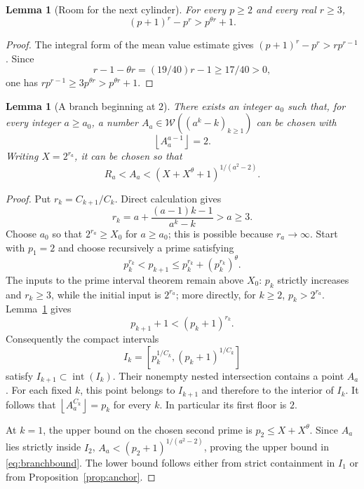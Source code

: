 \documentclass[11pt,a4paper]{article}
\newtheorem{lemma}[theorem]{Lemma}
\theoremstyle{definition}\newtheorem{definition}[theorem]{Definition}
\theoremstyle{remark}\newtheorem{remark}[theorem]{Remark}
\newcommand{\floor}[1]{\left\lfloor #1\right\rfloor}\newcommand{\ceil}[1]{\left\lceil #1\right\rceil}
\newcommand{\WW}{\mathcal W}
\begin{document}
\begin{lemma}[Room for the next cylinder]\label{lem:room}
For every $p\ge2$ and every real $r\ge3$,
\[
 (p+1)^r-p^r>p^{\theta r}+1.
\]
\end{lemma}
\begin{proof}
The integral form of the mean value estimate gives
$(p+1)^r-p^r>rp^{r-1}$. Since
\[
 r-1-\theta r=(19/40)r-1\ge17/40>0,
\]
one has $rp^{r-1}\ge3p^{\theta r}>p^{\theta r}+1$.
\end{proof}

\begin{lemma}[A branch beginning at $2$]\label{lem:branch}
There exists an integer $a_0$ such that, for every integer $a\ge a_0$,
a number $A_a\in\WW((a^k-k)_{k\ge1})$ can be chosen with
\[
 \floor{A_a^{a-1}}=2.
\]
Writing $X=2^{r_a}$, it can be chosen so that
\begin{equation}\label{eq:branchbound}
 R_a<A_a<(X+X^\theta+1)^{1/(a^2-2)}.
\end{equation}
\end{lemma}
\begin{proof}
Put $r_k=C_{k+1}/C_k$. Direct calculation gives
\begin{equation}\label{eq:ratiominus}
 r_k=a+\frac{(a-1)k-1}{a^k-k}>a\ge3.
\end{equation}
Choose $a_0$ so that $2^{r_a}\ge X_0$ for $a\ge a_0$; this is
possible because $r_a\to\infty$. Start with $p_1=2$ and choose
recursively a prime satisfying
\[
 p_k^{r_k}<p_{k+1}\le p_k^{r_k}+(p_k^{r_k})^\theta.
\]
The inputs to the prime interval theorem remain above $X_0$:
$p_k$ strictly increases and $r_k\ge3$, while the initial input is
$2^{r_a}$; more directly, for $k\ge2$, $p_k>2^{r_a}$.
Lemma~\ref{lem:room} gives
\[
 p_{k+1}+1<(p_k+1)^{r_k}.
\]
Consequently the compact intervals
\[
 I_k=[p_k^{1/C_k},(p_k+1)^{1/C_k}]
\]
satisfy $I_{k+1}\subset\operatorname{int}(I_k)$. Their nonempty
nested intersection contains a point $A_a$. For each fixed $k$,
this point belongs to $I_{k+1}$ and therefore to the interior of
$I_k$. It follows that $\floor{A_a^{C_k}}=p_k$ for every $k$.
In particular its first floor is $2$.

At $k=1$, the upper bound on the chosen second prime is
$p_2\le X+X^\theta$. Since $A_a$ lies strictly inside $I_2$,
$A_a<(p_2+1)^{1/(a^2-2)}$, proving the upper bound in
\eqref{eq:branchbound}. The lower bound follows either from strict
containment in $I_1$ or from Proposition~\ref{prop:anchor}.
\end{proof}
\end{document}
